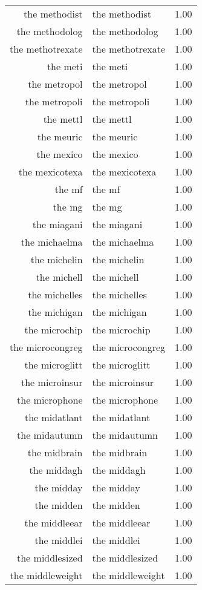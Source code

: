 \begin{table}[ht]
\begin{tabular}{rlr}
  the methodist & the methodist & 1.00 \\ 
  the methodolog & the methodolog & 1.00 \\ 
  the methotrexate & the methotrexate & 1.00 \\ 
  the meti & the meti & 1.00 \\ 
  the metropol & the metropol & 1.00 \\ 
  the metropoli & the metropoli & 1.00 \\ 
  the mettl & the mettl & 1.00 \\ 
  the meuric & the meuric & 1.00 \\ 
  the mexico & the mexico & 1.00 \\ 
  the mexicotexa & the mexicotexa & 1.00 \\ 
  the mf & the mf & 1.00 \\ 
  the mg & the mg & 1.00 \\ 
  the miagani & the miagani & 1.00 \\ 
  the michaelma & the michaelma & 1.00 \\ 
  the michelin & the michelin & 1.00 \\ 
  the michell & the michell & 1.00 \\ 
  the michelles & the michelles & 1.00 \\ 
  the michigan & the michigan & 1.00 \\ 
  the microchip & the microchip & 1.00 \\ 
  the microcongreg & the microcongreg & 1.00 \\ 
  the microglitt & the microglitt & 1.00 \\ 
  the microinsur & the microinsur & 1.00 \\ 
  the microphone & the microphone & 1.00 \\ 
  the midatlant & the midatlant & 1.00 \\ 
  the midautumn & the midautumn & 1.00 \\ 
  the midbrain & the midbrain & 1.00 \\ 
  the middagh & the middagh & 1.00 \\ 
  the midday & the midday & 1.00 \\ 
  the midden & the midden & 1.00 \\ 
  the middleear & the middleear & 1.00 \\ 
  the middlei & the middlei & 1.00 \\ 
  the middlesized & the middlesized & 1.00 \\ 
  the middleweight & the middleweight & 1.00 \\ 

\end{tabular}
\end{table}
